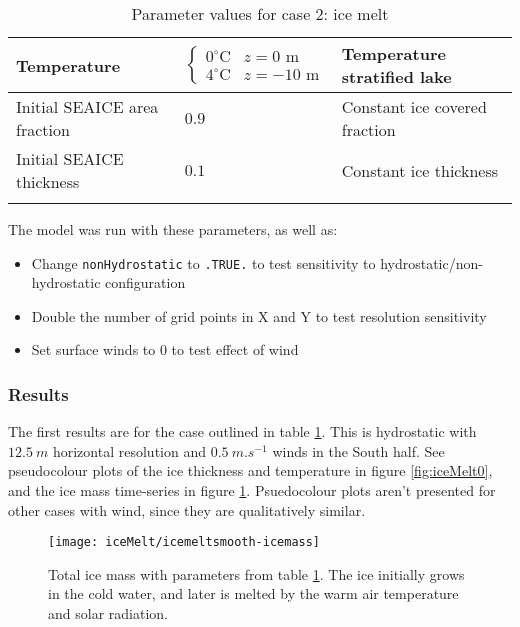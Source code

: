 \documentclass[11pt]{article}
\begin{document}
\begin{longtable}{  p{}  p{}  p{}  }
Temperature & \begin{equation*} \begin{cases} 0^{\circ} \text{C} & z = 0 \text{ m} \\ 4 ^{\circ} \text{C} & z = -10 \text{ m}   \end{cases} \end{equation*} & Temperature stratified lake \\ \hline
Initial SEAICE area fraction   & $0.9$ & Constant ice covered fraction \\ \hline
Initial SEAICE thickness    & $0.1$ & Constant ice thickness \\ \hline

\caption{Parameter values for case 2: ice melt}
\label{table:iceMelt}
\end{longtable}
The model was run with these parameters, as well as:
\begin{itemize}
\item{Change \verb|nonHydrostatic| to \verb|.TRUE.| to test sensitivity to hydrostatic/non-hydrostatic configuration}
\item{Double the number of grid points in X and Y to test resolution sensitivity}
\item{Set surface winds to 0 to test effect of wind}
\end{itemize}

\subsubsection{Results}
The first results are for the case outlined in table \ref{table:iceMelt}. This is hydrostatic with $\SI{12.5}{m}$ horizontal resolution and $\SI{0.5}{m.s^{-1}}$ winds in the South half. See pseudocolour plots of the ice thickness and temperature in figure \ref{fig:iceMelt0}, and the ice mass time-series in figure \ref{fig:iceMelt0IceMass}. Psuedocolour plots aren't presented for other cases with wind, since they are qualitatively similar.

\begin{figure}[h!]
\centering
\texttt{[image: iceMelt/icemeltsmooth-icemass]}
\caption{Total ice mass with parameters from table \ref{table:iceMelt}. The ice initially grows in the cold water, and later is melted by the warm air temperature and solar radiation.}
\label{fig:iceMelt0IceMass}
\end{figure}
\end{document}
